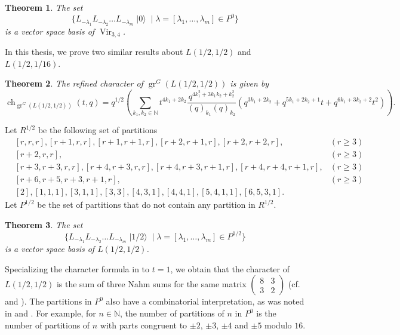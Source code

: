 \documentclass[a4paper, 12pt, reqno]{amsart}
\newtheorem{theorem}{Theorem}[section]
\theoremstyle{remark}
\DeclareMathOperator{\Vir}{Vir}
\DeclareMathOperator{\gr}{gr}
\DeclareMathOperator{\ch}{ch}
\DeclareMathOperator{\vac}{|0\rangle}
\DeclareMathOperator{\vachalf}{|1/2\rangle}
\begin{document}
\begin{theorem}
  \label{thr:2}
  The set
  \begin{equation*}
    \{L_{-\lambda_1}L_{-\lambda_2}\dots L_{-\lambda_m}\vac \mid \lambda = [\lambda_1, \dots, \lambda_m] \in P^0\}
  \end{equation*}
  is a vector space basis of $\Vir_{3, 4}$.
\end{theorem}

In this thesis, we prove two similar results about $L(1/2, 1/2)$ and $L(1/2, 1/16)$.

\begin{theorem}
  \label{thr:3}
  The refined character of $\gr^G(L(1/2, 1/2))$ is given by
  \begin{equation*}
    \ch_{\gr^G(L(1/2, 1/2))}(t, q) = q^{1/2}\left(\sum_{k_1, k_2 \in \mathbb{N}}t^{4k_1 + 2k_2}\frac{q^{4k_1^2 + 3k_1k_2 + k_2^2}}{(q)_{k_1}(q)_{k_2}}(q^{3k_1 + 2k_2} + q^{5k_1 + 2k_2 + 1}t + q^{6k_1 + 3k_2 + 2}t^2)\right).
  \end{equation*}
\end{theorem}

Let $R^{1/2}$ be the following set of partitions
\begin{align*}
  &[r, r, r], [r + 1, r, r], [r + 1, r + 1, r], [r + 2, r + 1, r], [r + 2, r + 2, r], &(r \ge 3) \\
  &[r + 2, r, r], &(r \ge 3) \\
  &[r + 3, r + 3, r, r], [r + 4, r + 3, r, r],  [r + 4, r + 3, r + 1, r], [r + 4, r + 4, r + 1, r], &(r \ge 3)\\
  &[r + 6, r + 5, r + 3, r + 1, r], &(r \ge 3) \\
  &[2], [1, 1, 1], [3, 1, 1], [3, 3], [4, 3, 1], [4, 4, 1], [5, 4, 1, 1], [6, 5, 3, 1].
\end{align*}
Let $P^{1/2}$ be the set of partitions that do not contain any partition in $R^{1/2}$.

\begin{theorem}
  \label{thr:4}
  The set
  \begin{equation*}
    \{L_{-\lambda_1}L_{-\lambda_2}\dots L_{-\lambda_m}\vachalf \mid \lambda = [\lambda_1, \dots, \lambda_m] \in P^{1/2}\}
  \end{equation*}
  is a vector space basis of $L(1/2, 1/2)$.
\end{theorem}

Specializing the character formula in  to $t = 1$, we obtain that the character of $L(1/2, 1/2)$ is the sum of three Nahm sums for the same matrix $\left(\begin{smallmatrix} 8 & 3 \\ 3 & 2 \end{smallmatrix}\right)$ (cf.\ \cite{Nahm2007} and \cite{andrews_singular_2022}).
The partitions in $P^0$ also have a combinatorial interpretation, as was noted in \cite{andrews_singular_2022} and \cite{tsuchioka_vertex_2023}.
For example, for $n \in \mathbb{N}$, the number of partitions of $n$ in $P^0$ is the number of partitions of $n$ with parts congruent to $\pm 2$, $\pm 3$, $\pm 4$ and $\pm 5$ modulo $16$.
\end{document}
